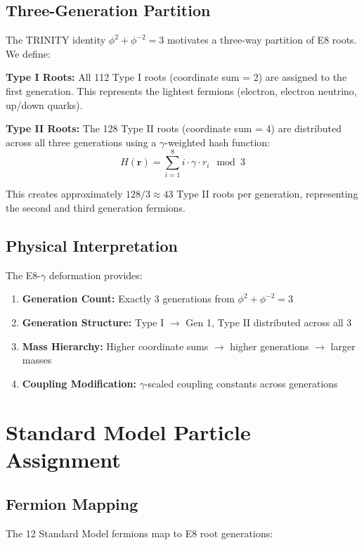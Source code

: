 \documentclass[12pt,a4paper]{article}
\begin{document}
\subsection{Three-Generation Partition}

The TRINITY identity $\phi^2 + \phi^{-2} = 3$ motivates a three-way partition of E8 roots. We define:

\textbf{Type I Roots:} All 112 Type I roots (coordinate sum = 2) are assigned to the first generation. This represents the lightest fermions (electron, electron neutrino, up/down quarks).

\textbf{Type II Roots:} The 128 Type II roots (coordinate sum = 4) are distributed across all three generations using a $\gamma$-weighted hash function:
\begin{equation}
H(\bm{r}) = \sum_{i=1}^{8} i \cdot \gamma \cdot r_i \mod 3
\end{equation}

This creates approximately $128/3 \approx 43$ Type II roots per generation, representing the second and third generation fermions.

\subsection{Physical Interpretation}

The E8-$\gamma$ deformation provides:
\begin{enumerate}
\item \textbf{Generation Count:} Exactly 3 generations from $\phi^2 + \phi^{-2} = 3$
\item \textbf{Generation Structure:} Type I $\to$ Gen 1, Type II distributed across all 3
\item \textbf{Mass Hierarchy:} Higher coordinate sums $\to$ higher generations $\to$ larger masses
\item \textbf{Coupling Modification:} $\gamma$-scaled coupling constants across generations
\end{enumerate}

\section{Standard Model Particle Assignment}

\subsection{Fermion Mapping}

The 12 Standard Model fermions map to E8 root generations:
\end{document}
